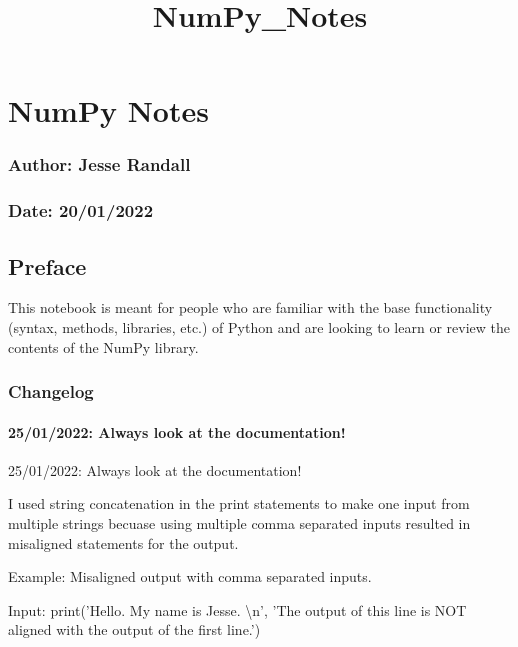 \documentclass[11pt]{article}
\title{NumPy\_Notes}
\begin{document}
    
    \maketitle
    
    

    
    \hypertarget{numpy-notes}{%
\section{NumPy Notes}\label{numpy-notes}}

\hypertarget{author-jesse-randall}{%
\subsubsection{Author: Jesse Randall}\label{author-jesse-randall}}

\hypertarget{date-20012022}{%
\subsubsection{Date: 20/01/2022}\label{date-20012022}}

    \hypertarget{preface}{%
\subsection{Preface}\label{preface}}
This notebook is meant for people who are familiar with the base
functionality (syntax, methods, libraries, etc.) of Python and are
looking to learn or review the contents of the NumPy library.
    \hypertarget{changelog}{%
\subsubsection{Changelog}\label{changelog}}

    \hypertarget{always-look-at-the-documentation}{%
\paragraph{25/01/2022: Always look at the
documentation!}\label{always-look-at-the-documentation}}
25/01/2022: Always look at the documentation!

I used string concatenation in the print statements to make one input from multiple strings becuase using multiple comma separated inputs resulted in misaligned statements for the output. 

Example: Misaligned output with comma separated inputs.

Input: print('Hello. My name is Jesse. {\textbackslash}n', 
             'The output of this line is NOT aligned with the output of the first line.')
                 
\end{document}
